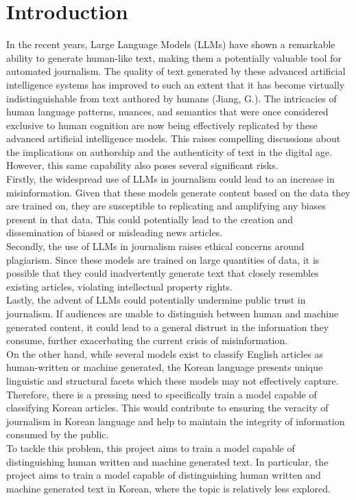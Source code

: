 \documentclass{article}
\begin{document}
\section{Introduction}
\quad In the recent years, Large Language Models (LLMs) have shown a remarkable ability to generate human-like text, making them a potentially valuable tool for automated journalism.
The quality of text generated by these advanced artificial intelligence systems has improved to such an extent that it has become virtually indistinguishable from text authored by humans (Jiang, G.).
The intricacies of human language patterns, nuances, and semantics that were once considered exclusive to human cognition are now being effectively replicated by these advanced artificial intelligence models.
This raises compelling discussions about the implications on authorship and the authenticity of text in the digital age.
However, this same capability also poses several significant risks. \\
\null\quad Firstly, the widespread use of LLMs in journalism could lead to an increase in misinformation.
Given that these models generate content based on the data they are trained on,
they are susceptible to replicating and amplifying any biases present in that data.
This could potentially lead to the creation and dissemination of biased or misleading news articles. \\
\null\quad Secondly, the use of LLMs in journalism raises ethical concerns around plagiarism.
Since these models are trained on large quantities of data,
it is possible that they could inadvertently generate text that closely resembles existing articles,
violating intellectual property rights. \\
\null\quad Lastly, the advent of LLMs could potentially undermine public trust in journalism.
If audiences are unable to distinguish between human and machine generated content,
it could lead to a general distrust in the information they consume,
further exacerbating the current crisis of misinformation. \\
\null\quad On the other hand, while several models exist to classify English articles as human-written or machine generated,
the Korean language presents unique linguistic and structural facets which these models may not effectively capture.
Therefore, there is a pressing need to specifically train a model capable of classifying Korean articles.
This would contribute to ensuring the veracity of journalism in Korean language and help to maintain the integrity of information consumed by the public. \\
\null\quad To tackle this problem, this project aims to train a model capable of distinguishing human written and machine generated text.
In particular, the project aims to train a model capable of distinguishing human written and machine generated text in Korean, where the topic is relatively less explored. \\
\end{document}
